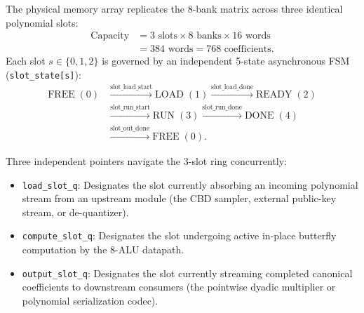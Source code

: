 The physical memory array replicates the 8-bank matrix across three identical polynomial slots:
\begin{align}
\label{eq:slot_capacity}
\text{Capacity} &= 3 \text{ slots} \times 8 \text{ banks} \times 16 \text{ words} \nonumber \\
&= 384 \text{ words} = 768 \text{ coefficients}.
\end{align}
Each slot $s \in \{0, 1, 2\}$ is governed by an independent 5-state asynchronous FSM (\texttt{slot\_state[s]}):
\begin{align}
\label{eq:slot_fsm}
\text{FREE} \; (0) &\xrightarrow{\text{slot\_load\_start}} \text{LOAD} \; (1) \xrightarrow{\text{slot\_load\_done}} \text{READY} \; (2) \nonumber \\
&\xrightarrow{\text{slot\_run\_start}} \text{RUN} \; (3) \xrightarrow{\text{slot\_run\_done}} \text{DONE} \; (4) \nonumber \\
&\xrightarrow{\text{slot\_out\_done}} \text{FREE} \; (0).
\end{align}

Three independent pointers navigate the 3-slot ring concurrently:
\begin{itemize}
    \item \texttt{load\_slot\_q}: Designates the slot currently absorbing an incoming polynomial stream from an upstream module (the CBD sampler, external public-key stream, or de-quantizer).
    \item \texttt{compute\_slot\_q}: Designates the slot undergoing active in-place butterfly computation by the 8-ALU datapath.
    \item \texttt{output\_slot\_q}: Designates the slot currently streaming completed canonical coefficients to downstream consumers (the pointwise dyadic multiplier or polynomial serialization codec).
\end{itemize}

